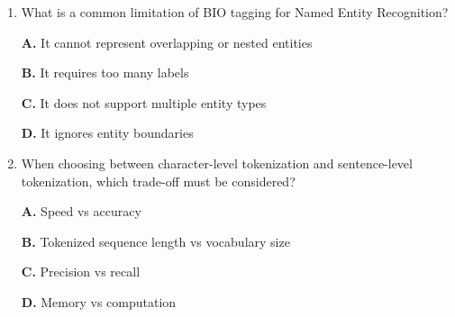 \documentclass[11pt]{article}
\begin{document}
\begin{enumerate}[label=Q\arabic*., leftmargin=*]
\textbf{D.} Sentiment analysis

\item What is a common limitation of BIO tagging for Named Entity Recognition?

\textbf{A.} It cannot represent overlapping or nested entities

\textbf{B.} It requires too many labels

\textbf{C.} It does not support multiple entity types

\textbf{D.} It ignores entity boundaries

\item When choosing between character-level tokenization and sentence-level tokenization, which trade-off must be considered?

\textbf{A.} Speed vs accuracy

\textbf{B.} Tokenized sequence length vs vocabulary size

\textbf{C.} Precision vs recall

\textbf{D.} Memory vs computation

\end{enumerate}
\end{document}
